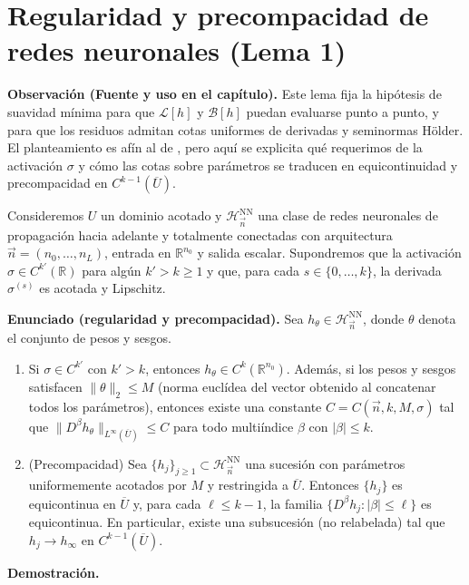 \section{Regularidad y precompacidad de redes neuronales (Lema 1)}


\medskip
\noindent\textbf{Observación (Fuente y uso en el capítulo).}
Este lema fija la hipótesis de suavidad mínima para que $\mathcal{L}[h]$ y $\mathcal{B}[h]$ puedan evaluarse punto a punto,
y para que los residuos admitan cotas uniformes de derivadas y seminormas Hölder. El planteamiento es afín al de
\cite[Lema~2.1]{shin2020convergence}, pero aquí se explicita qué requerimos de la activación $\sigma$ y cómo las cotas sobre
parámetros se traducen en equicontinuidad y precompacidad en $C^{k-1}(\overline U)$.
\medskip

Consideremos $U$ un dominio acotado y $\mathcal{H}^{\mathrm{NN}}_{\vec n}$ una clase de redes neuronales de propagación hacia adelante y totalmente conectadas con arquitectura $\vec n=(n_0,\dots,n_L)$, entrada en $\mathbb{R}^{n_0}$ y salida escalar.
Supondremos que la activación $\sigma\in C^{k'}(\mathbb{R})$ para algún $k'>k\ge 1$ y que, para cada
$s\in\{0,\dots,k\}$, la derivada $\sigma^{(s)}$ es acotada y Lipschitz.

\medskip
\noindent\textbf{Enunciado (regularidad y precompacidad).}
Sea $h_\theta\in\mathcal{H}^{\mathrm{NN}}_{\vec n}$, donde $\theta$ denota el conjunto de pesos y sesgos.
\begin{enumerate}
\item Si $\sigma\in C^{k'}$ con $k'>k$, entonces $h_\theta\in C^k(\mathbb{R}^{n_0})$. Además, si los pesos y
sesgos satisfacen $\|\theta\|_2\le M$ (norma euclídea del vector obtenido al concatenar todos los parámetros), entonces existe una
constante $C=C(\vec n,k,M,\sigma)$ tal que $\|D^\beta h_\theta\|_{L^\infty(\overline U)}\le C$ para todo
multiíndice $\beta$ con $|\beta|\le k$.
\item (Precompacidad) Sea $\{h_j\}_{j\ge 1}\subset\mathcal{H}^{\mathrm{NN}}_{\vec n}$ una sucesión con
parámetros uniformemente acotados por $M$ y restringida a $\overline U$. Entonces $\{h_j\}$ es equicontinua
en $\overline U$ y, para cada $\ell\le k-1$, la familia $\{D^\beta h_j:|\beta|\le \ell\}$ es equicontinua.
En particular, existe una subsucesión (no relabelada) tal que $h_j\to h_\infty$ en $C^{k-1}(\overline U)$.
\end{enumerate}

\medskip
\noindent\textbf{Demostración.}

